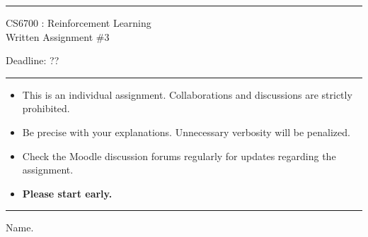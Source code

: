 \documentclass[solution,addpoints,12pt]{exam}
\begin{document}
\hrule
\vspace{1mm}
\noindent 
\begin{center}
{\Large CS6700 : Reinforcement Learning} \\
{\large Written Assignment \#3}
\end{center}
\vspace{1mm}
\noindent 
{\large \hfill Deadline: ??}

\vspace{2mm}
\hrule

{\small

\begin{itemize}\itemsep0mm
\item This is an individual assignment. Collaborations and discussions are strictly
prohibited.
\item Be precise with your explanations. Unnecessary verbosity will be penalized.
\item Check the Moodle discussion forums regularly for updates regarding the assignment.
\item \textbf{Please start early.}
\end{itemize}
}

\hrule

\vspace{3mm}
 Name. \\[1mm]
 \\
\end{document}
